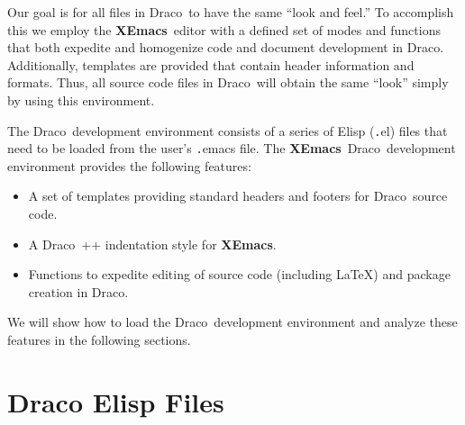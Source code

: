 \documentclass[11pt]{nmemo}
\newcommand{\comp}[1]{{\normalfont\texttt#1}}
\newcommand{\draco}{{\normalfont\sffamily Draco}}
\newcommand{\xemacs}{{\normalfont\bfseries XEmacs}}
\begin{document}
Our goal is for all files in \draco\ to have the same ``look and
feel.''  To accomplish this we employ the \xemacs\ editor with a
defined set of modes and functions that both expedite and homogenize
code and document development in \draco.  Additionally, templates are
provided that contain header information and formats.  Thus, all
source code files in \draco\ will obtain the same ``look'' simply by
using this environment.

The \draco\ development environment consists of a series of Elisp
(\comp{.el}) files that need to be loaded from the user's
\comp{.emacs} file.  The \xemacs\ \draco\ development environment
provides the following features:
\begin{itemize}
\item A set of templates providing standard headers and footers for
  \draco\ source code.
\item A \draco\ \C++ indentation style for \xemacs.
\item Functions to expedite editing of source code (including \LaTeX)
  and package creation in \draco.
\end{itemize}
We will show how to load the \draco\ development environment and
analyze these features in the following sections.


\section{Draco Elisp Files}
\end{document}
